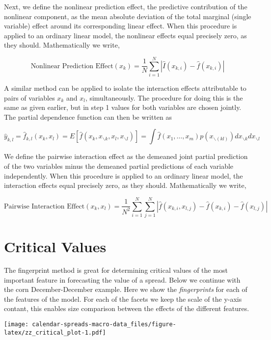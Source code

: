 \documentclass[
]{book}
\begin{document}
Next, we define the nonlinear prediction effect, the predictive contribution of the nonlinear component, as the mean absolute deviation of the total marginal (single variable) effect around its corresponding linear effect. When this procedure is applied to an ordinary linear model, the nonlinear effects equal precisely zero, as they should. Mathematically we write,

\[
\text{Nonlinear Prediction Effect}(x_k) = \frac{1}{N} \sum^{N}_{i=1}\left| \hat{I}(x_{k,i}) -  \hat{f}(x_{k,i}) \right|
\]

A similar method can be applied to isolate the interaction effects attributable to pairs of variables \(x_k\) and \(x_l\), simultaneously. The procedure for doing this is the same as given earlier, but in step 1 values for both variables are chosen jointly. The partial dependence function can then be written as

\[
\hat{y}_{k,l} = \hat{f}_{k,l}(x_k, x_l) = E[\hat{f}(x_k, x_{\backslash k}, x_l, x_{\backslash l})] = \int \hat{f}(x_1, \dots, x_m) p(x_{\backslash (k l)}) dx_{\backslash k}dx_{\backslash l}
\]

We define the pairwise interaction effect as the demeaned joint partial prediction of the two variables minus the demeaned partial predictions of each variable independently. When this procedure is applied to an ordinary linear model, the interaction effects equal precisely zero, as they should. Mathematically we write,

\[
\text{Pairwise Interaction Effect}(x_k, x_l) = \frac{1}{N^2} \sum^{N}_{i=1} \sum^{N}_{j=1} \left| \hat{f}(x_{k,i}, x_{l, j}) - \hat{f}(x_{k,i}) - \hat{f}(x_{l, j})\right|
\]

\hypertarget{critical-values}{%
\section{Critical Values}\label{critical-values}}

The fingerprint method is great for determining critical values of the most important feature in forecasting the value of a spread. Below we continue with the corn December-December example. Here we show the \emph{fingerprints} for each of the features of the model. For each of the facets we keep the scale of the y-axis contant, this enables size comparison between the effects of the different features.

\texttt{[image: calendar-spreads-macro-data\_files/figure-latex/zz\_critical\_plot-1.pdf]}
\end{document}
